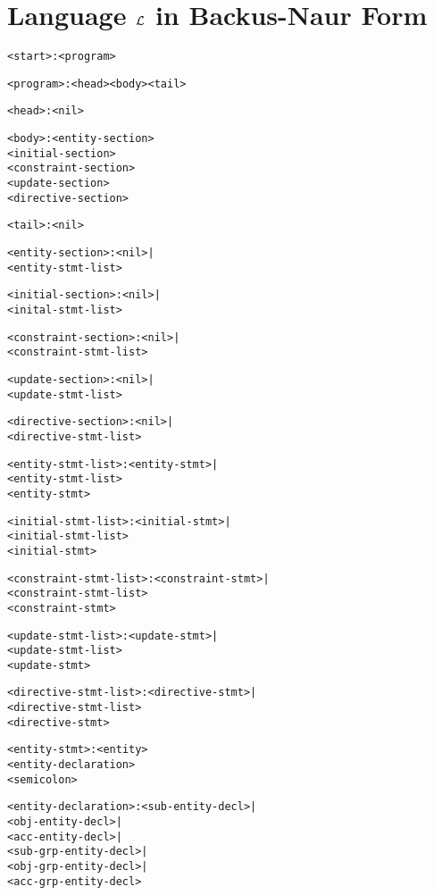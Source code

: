 \documentclass[11pt]{report}
\newenvironment{vverbatim}
{
  \begin{alltt}
}
{
    \vspace{-\baselineskip}
  \end{alltt}
}
\begin{document}
    \section{Language ${\cal L}$ in Backus-Naur Form}
      \label{sect-langs-bnfll}

      \begin{vverbatim}
<start>                  : <program>

<program>                : <head> <body> <tail>

<head>                   : <nil>

<body>                   : <entity-section>
                           <initial-section>
                           <constraint-section>
                           <update-section>
                           <directive-section>

<tail>                   : <nil>

<entity-section>         : <nil> |
                           <entity-stmt-list>

<initial-section>        : <nil> |
                           <inital-stmt-list>

<constraint-section>     : <nil> |
                           <constraint-stmt-list>

<update-section>         : <nil> |
                           <update-stmt-list>

<directive-section>      : <nil> |
                           <directive-stmt-list>

<entity-stmt-list>       : <entity-stmt> |
                           <entity-stmt-list>
                           <entity-stmt>

<initial-stmt-list>      : <initial-stmt> |
                           <initial-stmt-list>
                           <initial-stmt>

<constraint-stmt-list>   : <constraint-stmt> |
                           <constraint-stmt-list>
                           <constraint-stmt>

<update-stmt-list>       : <update-stmt> |
                           <update-stmt-list>
                           <update-stmt>

<directive-stmt-list>    : <directive-stmt> |
                           <directive-stmt-list>
                           <directive-stmt>

<entity-stmt>            : <entity>
                           <entity-declaration>
                           <semicolon>

<entity-declaration>     : <sub-entity-decl> |
                           <obj-entity-decl> |
                           <acc-entity-decl> |
                           <sub-grp-entity-decl> |
                           <obj-grp-entity-decl> |
                           <acc-grp-entity-decl>


\end{vverbatim}
\end{document}
